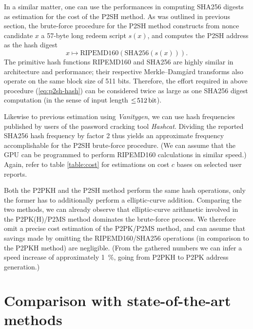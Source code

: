 \documentclass[a4paper,11pt,titlepage]{scrbook}
\begin{document}
In a similar matter, one can use the performances in computing {SHA256} digests as estimation for the cost of the {P2SH} method.
As was outlined in previous section, the brute-force procedure for the {P2SH} method constructs from nonce candidate $x$ a 57-byte long redeem script $s(x)$, and computes the {P2SH} address as the hash digest 
\begin{equation}
    x \mapsto \text{{RIPEMD160}}(\text{{SHA256}}(s(x))).\label{eq:p2sh-hash}
\end{equation}
The primitive hash functions {RIPEMD160} and {SHA256} are highly similar in architecture and performance; their respective Merkle–Damgård transforms also operate on the same block size of 511 bits.
Therefore, the effort required in above procedure (\ref{eq:p2sh-hash}) can be considered twice as large as one {SHA256} digest computation (in the sense of input length $\leq\!\SI{512}{\bit}$). 

Likewise to previous estimation using \emph{Vanitygen}, we can use hash frequencies published by users of the password cracking tool \emph{Hashcat}.
Dividing the reported SHA256 hash frequency by factor 2 thus yields an approximate frequency accomplishable for the P2SH brute-force procedure.
(We can assume that the GPU can be programmed to perform RIPEMD160 calculations in similar speed.)
Again, refer to table \ref{table:cost} for estimations on cost $c$ bases on selected user reports.

Both the P2PKH and the P2SH method perform the same hash operations, only the former has to additionally perform a elliptic-curve addition.
Comparing the two methods, we can already observe that elliptic-curve arithmetic involved in the P2PK(H)/P2MS method dominates the brute-force process.
We therefore omit a precise cost estimation of the P2PK/P2MS method, and can assume that savings made by omitting the RIPEMD160/SHA256 operations (in comparison to the P2PKH method) are negligible.
(From the gathered numbers we can infer a speed increase of approximately \SI{1}{\percent}, going from P2PKH to P2PK address generation.)

\section{Comparison with state-of-the-art methods}\label{sec:comparison}
\end{document}
